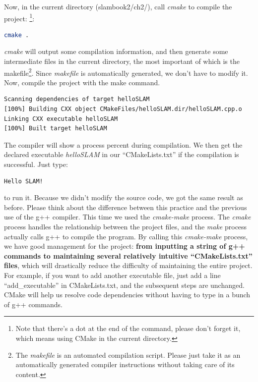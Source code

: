 Now, in the current directory (slambook2/ch2/), call \textit{cmake} to compile the project: \footnote{Note that there's a dot at the end of the command, please don't forget it, which means using CMake in the current directory. }:
\begin{lstlisting}[language=sh,caption=Terminal input]
cmake .
\end{lstlisting}
\textit{cmake} will output some compilation information, and then generate some intermediate files in the current directory, the most important of which is the makefile\footnote{The \textit{makefile} is an automated compilation script. Please just take it as an automatically generated compiler instructions without taking care of its content. }. Since \textit{makefile} is automatically generated, we don't have to modify it. Now, compile the project with the make command.
\begin{lstlisting}[language=sh,caption=Terminal input]
% make
Scanning dependencies of target helloSLAM
[100%] Building CXX object CMakeFiles/helloSLAM.dir/helloSLAM.cpp.o
Linking CXX executable helloSLAM
[100%] Built target helloSLAM
\end{lstlisting}
The compiler will show a process percent during compilation. We then get the declared executable \textit{helloSLAM} in our ``CMakeLists.txt'' if the compilation is successful. Just type:
\begin{lstlisting}[language=sh,caption=Terminal Input]
% ./helloSLAM
Hello SLAM!
\end{lstlisting}
to run it. Because we didn't modify the source code, we got the same result as before. Please think about the difference between this practice and the previous use of the g++ compiler. This time we used the \textit{cmake-make} process. The \textit{cmake} process handles the relationship between the project files, and the \textit{make} process actually calls g++ to compile the program. By calling this \textit{cmake-make} process, we have good management for the project: \textbf{from inputting a string of g++ commands to maintaining several relatively intuitive ``CMakeLists.txt'' files}, which will drastically reduce the difficulty of maintaining the entire project. For example, if you want to add another executable file, just add a line ``add\_executable'' in CMakeLists.txt, and the subsequent steps are unchanged. CMake will help us resolve code dependencies without having to type in a bunch of g++ commands.

